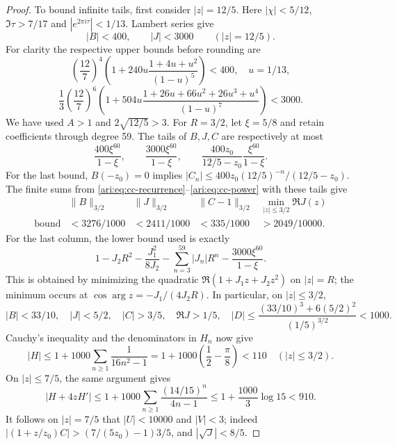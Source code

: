\begin{proof}
To bound infinite tails, first consider $|z|=12/5$.
Here $|\chi|<5/12$, $\Im\tau>7/17$ and
$|e^{2\pi i\tau}|<1/13$. Lambert series give
\begin{equation}\label{ari:eq:cc-outer}
 |B|<400,\qquad |J|<3000\qquad (|z|=12/5).
\end{equation}
For clarity the respective upper bounds before rounding are
\[
 \left(\frac{12}{7}\right)^4
 \left(1+240u\frac{1+4u+u^2}{(1-u)^5}\right)<400,
 \quad u=1/13,
\]
\[
 \frac13\left(\frac{12}{7}\right)^6
 \left(1+504u\frac{1+26u+66u^2+26u^3+u^4}{(1-u)^7}\right)<3000.
\]
We have used $A>1$ and $2\sqrt{12/5}>3$.
For $R=3/2$, let $\xi=5/8$ and retain coefficients through
degree 59. The tails of $B,J,C$ are respectively at most
\begin{equation}\label{ari:eq:cc-tail60}
 \frac{400\xi^{60}}{1-\xi},\qquad
 \frac{3000\xi^{60}}{1-\xi},\qquad
 \frac{400z_0}{12/5-z_0}\frac{\xi^{60}}{1-\xi}.
\end{equation}
For the last bound, $B(-z_0)=0$ implies
$|C_n|\le400z_0(12/5)^{-n}/(12/5-z_0)$.
The finite sums from \eqref{ari:eq:cc-recurrence}--\eqref{ari:eq:cc-power}
with these tails give
\[
 \begin{array}{c|cccc}
 &\|B\|_{3/2}&\|J\|_{3/2}&\|C-1\|_{3/2}
                   &\min_{|z|\le3/2}\Re J(z)\\ \hline
 \text{bound}&<3276/1000&<2411/1000&<335/1000&>2049/10000.
 \end{array}
\]
For the last column, the lower bound used is exactly
\[
 1-J_2R^2-\frac{J_1^2}{8J_2}
       -\sum_{n=3}^{59}|J_n|R^n-
                   \frac{3000\xi^{60}}{1-\xi}.
\]
This is obtained by minimizing the quadratic
$\Re(1+J_1z+J_2z^2)$ on $|z|=R$; the minimum occurs at
$\cos\arg z=-J_1/(4J_2R)$. In particular, on $|z|\le3/2$,
\[
 |B|<33/10,\quad |J|<5/2,\quad |C|>3/5,\quad
 \Re J>1/5,\quad
 |D|\le\frac{(33/10)^3+6(5/2)^2}{(1/5)^{3/2}}<1000.
\]
Cauchy's inequality and the denominators in $H_n$ now give
\[
 |H|\le1+1000\sum_{n\ge1}\frac1{16n^2-1}
       =1+1000\left(\frac12-\frac\pi8\right)<110
                      \quad (|z|\le3/2).
\]
On $|z|\le7/5$, the same argument gives
\[
 |H+4zH'|\le1+1000\sum_{n\ge1}
                 \frac{(14/15)^n}{4n-1}
       \le1+\frac{1000}{3}\log15<910.
\]
It follows on $|z|=7/5$ that $|U|<10000$ and $|V|<3$;
indeed $|(1+z/z_0)C|>(7/(5z_0)-1)3/5$, and
$|\sqrt J|<8/5$.


\end{proof}
